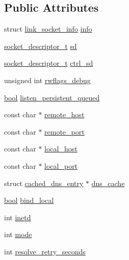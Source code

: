 \subsection*{Public Attributes}
\begin{DoxyCompactItemize}
\item 
struct \hyperlink{structlink__socket__info}{link\+\_\+socket\+\_\+info} \hyperlink{structlink__socket_a4758d694c759a1aab884bc1cc5ab969f}{info}
\item 
\hyperlink{syshead_8h_a7433d79fe33816fe24b9c231ac75fc42}{socket\+\_\+descriptor\+\_\+t} \hyperlink{structlink__socket_aef0ab7aed42bb525241ae838e98ce8cd}{sd}
\item 
\hyperlink{syshead_8h_a7433d79fe33816fe24b9c231ac75fc42}{socket\+\_\+descriptor\+\_\+t} \hyperlink{structlink__socket_aa7175ad31d03505bc3e4ae9cee7b01d9}{ctrl\+\_\+sd}
\item 
unsigned int \hyperlink{structlink__socket_a2eb3263b82cffec1f1b29866157c56a8}{rwflags\+\_\+debug}
\item 
\hyperlink{automatic_8c_abb452686968e48b67397da5f97445f5b}{bool} \hyperlink{structlink__socket_a997203703be187550fa55ba1f6eb15d2}{listen\+\_\+persistent\+\_\+queued}
\item 
const char $\ast$ \hyperlink{structlink__socket_a2e4c65ab398681555a465ae7edef334e}{remote\+\_\+host}
\item 
const char $\ast$ \hyperlink{structlink__socket_a56a53dd8880d191a5c9e44b4345179c8}{remote\+\_\+port}
\item 
const char $\ast$ \hyperlink{structlink__socket_a5fdf06bda040b06ddf1598b03e553983}{local\+\_\+host}
\item 
const char $\ast$ \hyperlink{structlink__socket_a94440573fc8c73b414ece119f679f374}{local\+\_\+port}
\item 
struct \hyperlink{structcached__dns__entry}{cached\+\_\+dns\+\_\+entry} $\ast$ \hyperlink{structlink__socket_acb1f6f8229c3d38364d74d7a88c7c09d}{dns\+\_\+cache}
\item 
\hyperlink{automatic_8c_abb452686968e48b67397da5f97445f5b}{bool} \hyperlink{structlink__socket_a5d0273818bc55dd3be2a9b856816659e}{bind\+\_\+local}
\item 
int \hyperlink{structlink__socket_a3b8f6b6038fc694204d898d0417cf4f0}{inetd}
\item 
int \hyperlink{structlink__socket_aaf4c7db16f0d905338f8d221f09177ee}{mode}
\item 
int \hyperlink{structlink__socket_ac2b6bf38dc70b6b263f23a687611b4bf}{resolve\+\_\+retry\+\_\+seconds}

\end{DoxyCompactItemize}
